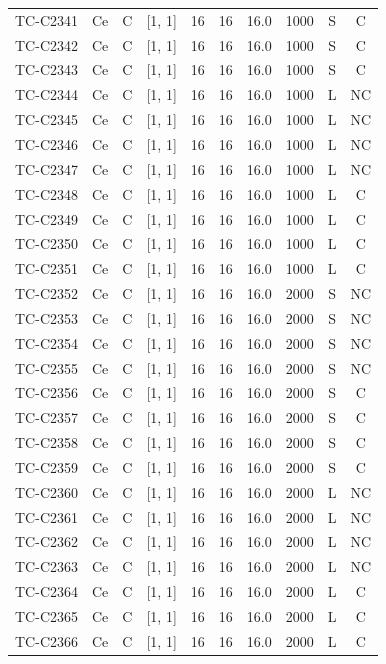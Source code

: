 \begin{longtable}{lccccccccc}
TC-C2341 & Ce & C & [1, 1] & 16 & 16 & 16.0 & 1000 & S & C \\
TC-C2342 & Ce & C & [1, 1] & 16 & 16 & 16.0 & 1000 & S & C \\
TC-C2343 & Ce & C & [1, 1] & 16 & 16 & 16.0 & 1000 & S & C \\
TC-C2344 & Ce & C & [1, 1] & 16 & 16 & 16.0 & 1000 & L & NC \\
TC-C2345 & Ce & C & [1, 1] & 16 & 16 & 16.0 & 1000 & L & NC \\
TC-C2346 & Ce & C & [1, 1] & 16 & 16 & 16.0 & 1000 & L & NC \\
TC-C2347 & Ce & C & [1, 1] & 16 & 16 & 16.0 & 1000 & L & NC \\
TC-C2348 & Ce & C & [1, 1] & 16 & 16 & 16.0 & 1000 & L & C \\
TC-C2349 & Ce & C & [1, 1] & 16 & 16 & 16.0 & 1000 & L & C \\
TC-C2350 & Ce & C & [1, 1] & 16 & 16 & 16.0 & 1000 & L & C \\
TC-C2351 & Ce & C & [1, 1] & 16 & 16 & 16.0 & 1000 & L & C \\
TC-C2352 & Ce & C & [1, 1] & 16 & 16 & 16.0 & 2000 & S & NC \\
TC-C2353 & Ce & C & [1, 1] & 16 & 16 & 16.0 & 2000 & S & NC \\
TC-C2354 & Ce & C & [1, 1] & 16 & 16 & 16.0 & 2000 & S & NC \\
TC-C2355 & Ce & C & [1, 1] & 16 & 16 & 16.0 & 2000 & S & NC \\
TC-C2356 & Ce & C & [1, 1] & 16 & 16 & 16.0 & 2000 & S & C \\
TC-C2357 & Ce & C & [1, 1] & 16 & 16 & 16.0 & 2000 & S & C \\
TC-C2358 & Ce & C & [1, 1] & 16 & 16 & 16.0 & 2000 & S & C \\
TC-C2359 & Ce & C & [1, 1] & 16 & 16 & 16.0 & 2000 & S & C \\
TC-C2360 & Ce & C & [1, 1] & 16 & 16 & 16.0 & 2000 & L & NC \\
TC-C2361 & Ce & C & [1, 1] & 16 & 16 & 16.0 & 2000 & L & NC \\
TC-C2362 & Ce & C & [1, 1] & 16 & 16 & 16.0 & 2000 & L & NC \\
TC-C2363 & Ce & C & [1, 1] & 16 & 16 & 16.0 & 2000 & L & NC \\
TC-C2364 & Ce & C & [1, 1] & 16 & 16 & 16.0 & 2000 & L & C \\
TC-C2365 & Ce & C & [1, 1] & 16 & 16 & 16.0 & 2000 & L & C \\
TC-C2366 & Ce & C & [1, 1] & 16 & 16 & 16.0 & 2000 & L & C \\

\end{longtable}
